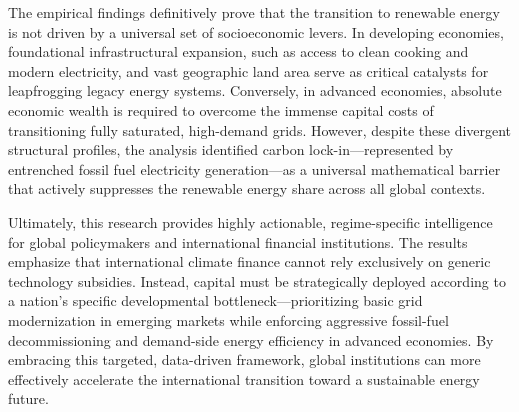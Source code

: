 \documentclass[a4paper,11pt]{article}
\begin{document}
The empirical findings definitively prove that the transition to renewable energy is not driven by a universal set of socioeconomic levers.
In developing economies, foundational infrastructural expansion, such as access to clean cooking and modern electricity, and vast geographic land area serve as critical catalysts for leapfrogging legacy energy systems.
Conversely, in advanced economies, absolute economic wealth is required to overcome the immense capital costs of transitioning fully saturated, high-demand grids. However, despite these divergent structural profiles, the analysis identified carbon lock-in—represented by entrenched fossil fuel electricity generation—as a universal mathematical barrier that actively suppresses the renewable energy share across all global contexts. 

Ultimately, this research provides highly actionable, regime-specific intelligence for global policymakers and international financial institutions.
The results emphasize that international climate finance cannot rely exclusively on generic technology subsidies.
Instead, capital must be strategically deployed according to a nation's specific developmental bottleneck—prioritizing basic grid modernization in emerging markets while enforcing aggressive fossil-fuel decommissioning and demand-side energy efficiency in advanced economies.
By embracing this targeted, data-driven framework, global institutions can more effectively accelerate the international transition toward a sustainable energy future.

\newpage
\printbibliography
\end{document}
